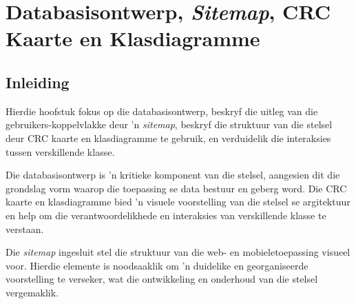 \chapter{Databasisontwerp, \textit{Sitemap}, CRC Kaarte en Klasdiagramme}

\section{Inleiding}
Hierdie hoofstuk fokus op die databasisontwerp, beskryf die uitleg van die
gebruikers-koppelvlakke deur 'n \textit{sitemap}, beskryf die struktuur van die
stelsel deur \ac{CRC} kaarte en klasdiagramme te gebruik, en verduidelik die
interaksies tussen verskillende klasse. 

Die databasisontwerp is 'n kritieke komponent van die stelsel, aangesien dit die grondslag vorm waarop die
toepassing se data bestuur en geberg word. Die \ac{CRC} kaarte en klasdiagramme
bied 'n visuele voorstelling van die stelsel se argitektuur en help om die
verantwoordelikhede en interaksies van verskillende klasse te verstaan.

Die \textit{sitemap} ingesluit stel die struktuur van die web- en
mobieletoepassing visueel voor. Hierdie elemente is noodsaaklik om 'n
duidelike en georganiseerde voorstelling te verseker, wat die ontwikkeling en onderhoud van die stelsel vergemaklik.




